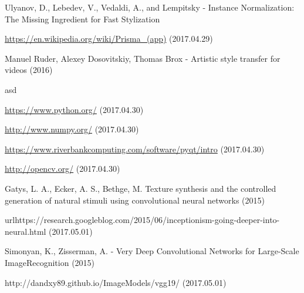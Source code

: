 \documentclass[12pt, a4paper, oneside]{book}
\theoremstyle{tetel}
\begin{document}
\begin{thebibliography}{1}
Ulyanov, D., Lebedev, V., Vedaldi, A., and Lempitsky - Instance Normalization: The Missing Ingredient for Fast Stylization

\url{https://en.wikipedia.org/wiki/Prisma_(app)} (2017.04.29)

Manuel Ruder, Alexey Dosovitskiy, Thomas Brox - Artistic style transfer for videos (2016)

asd

\url{https://www.python.org/} (2017.04.30)

\url{http://www.numpy.org/} (2017.04.30)

\url{https://www.riverbankcomputing.com/software/pyqt/intro} (2017.04.30)

\url{http://opencv.org/} (2017.04.30)

Gatys, L. A., Ecker, A. S., Bethge, M. Texture synthesis and the controlled generation of natural stimuli using convolutional neural networks (2015)

url{https://research.googleblog.com/2015/06/inceptionism-going-deeper-into-neural.html} (2017.05.01)

Simonyan, K., Zisserman, A. - Very Deep Convolutional Networks for Large-Scale ImageRecognition (2015)

http://dandxy89.github.io/ImageModels/vgg19/ (2017.05.01)


\end{thebibliography}
\end{document}
